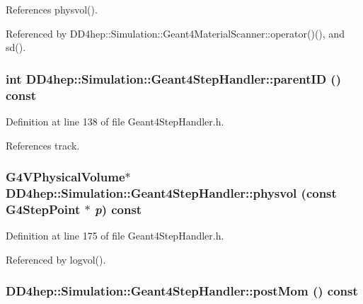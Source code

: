 References physvol().

Referenced by DD4hep::Simulation::Geant4MaterialScanner::operator()(), and sd().\hypertarget{class_d_d4hep_1_1_simulation_1_1_geant4_step_handler_a3c5bcd136c18f2269c58e81f36e97eae}{
\subsubsection[{parentID}]{\setlength{\rightskip}{0pt plus 5cm}int DD4hep::Simulation::Geant4StepHandler::parentID () const}}
\label{class_d_d4hep_1_1_simulation_1_1_geant4_step_handler_a3c5bcd136c18f2269c58e81f36e97eae}


Definition at line 138 of file Geant4StepHandler.h.

References track.\hypertarget{class_d_d4hep_1_1_simulation_1_1_geant4_step_handler_ab484afdaf7e593c1f2f41e70aaf9cb71}{
\subsubsection[{physvol}]{\setlength{\rightskip}{0pt plus 5cm}G4VPhysicalVolume$\ast$ DD4hep::Simulation::Geant4StepHandler::physvol (const G4StepPoint $\ast$ {\em p}) const}}
\label{class_d_d4hep_1_1_simulation_1_1_geant4_step_handler_ab484afdaf7e593c1f2f41e70aaf9cb71}


Definition at line 175 of file Geant4StepHandler.h.

Referenced by logvol().\hypertarget{class_d_d4hep_1_1_simulation_1_1_geant4_step_handler_a20327303625dbb2ae209885d2b098564}{
\subsubsection[{postMom}]{ DD4hep::Simulation::Geant4StepHandler::postMom () const}}
\label{class_d_d4hep_1_1_simulation_1_1_geant4_step_handler_a20327303625dbb2ae209885d2b098564}


